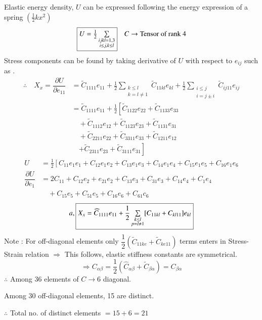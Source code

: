 Elastic energy density, $U$ can be expressed following the energy expression of a spring $(\frac{1}{2}kx^{2})$
$$
\fbox{$U=\frac{1}{2}\sum\limits_{\substack{ijkl=1,3\\ i\leq j,k\leq l}}$}\quad C\to \text{Tensor of rank 4}
$$
Stress components can be found by taking derivative of $U$ with respect to $e_{ij}$ such as .
\begin{align*}
\therefore\quad X_{x}=\dfrac{\partial U}{\partial e_{11}} &= \widetilde{C}_{1111}e_{11}+\frac{1}{2}\sum\limits_{\substack{k\leq l\\ k=l\neq 1}}\widetilde{C}_{11kl}e_{kl}+\frac{1}{2}\sum\limits_{\substack{i\leq j\\ i=j\pm i}}\widetilde{C}_{ij11}e_{ij}\\
&= \widetilde{C}_{1111}e_{11}+\frac{1}{2}\left[\widetilde{C}_{1122}e_{22}+\widetilde{C}_{1133}e_{33}\right.\\
&\quad +\widetilde{C}_{1112}e_{12}+\widetilde{C}_{1123}e_{23}+\widetilde{C}_{1131}e_{31}\\
&\quad +\widetilde{C}_{2211}e_{22}+\widetilde{C}_{3311}e_{33}+\widetilde{C}_{1211}e_{12}\\
&\quad \left.+\widetilde{C}_{2311}e_{23}+\widetilde{C}_{3111}e_{31}\right]
\end{align*}
\begin{align*}
U &=\frac{1}{2}\left[C_{11}e_{1}e_{1}+C_{12}e_{1}e_{2}+C_{13}e_{1}e_{3}+C_{14}e_{1}e_{4}+C_{15}e_{1}e_{5}+C_{16}e_{1}e_{6}\right.\\
\dfrac{\partial U}{\partial e_{1}} &= 2C_{11}+C_{12}e_{2}+e_{21}e_{2}+C_{13}e_{3}+C_{31}e_{3}+C_{14}e_{4}+C_{1}e_{4}\\
&\quad +C_{15}e_{5}+C_{51}e_{5}+C_{16}e_{6}+C_{61}c_{6}
\end{align*}
$$
a, \fbox{$X_{x}=\widehat{C}_{1111}e_{11}+\dfrac{1}{2}\sum\limits_{\substack{k\leq l\\ p=l\neq 1}}[C_{11kl}+C_{kl11}]e_{kl}$}
$$
Note : For off-diagonal elements only $\dfrac{1}{2}(\widetilde{C}_{11ke}+\widetilde{C}_{ke11})$ terms enters in Stress-Strain relation $\Rightarrow$ This follows, elastic stiffness constants are symmetrical.
$$
\Rightarrow C_{\alpha\beta}=\frac{1}{2}(\widehat{C}_{\alpha\beta}+\widetilde{C}_{\beta\alpha})=C_{\beta\alpha}
$$
$\therefore$ Among 36 elements of $C\to 6$ diagonal.

Among 30 off-diagonal elements, 15 are distinct.

$\therefore$ Total no. of distinct elements $=15+6=21$

